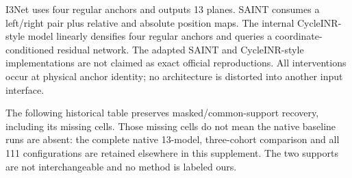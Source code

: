 I3Net uses four regular anchors and outputs 13 planes. SAINT consumes a left/right pair plus relative and absolute position maps. The internal CycleINR-style model linearly densifies four regular anchors and queries a coordinate-conditioned residual network. The adapted SAINT and CycleINR-style implementations are not claimed as exact official reproductions. All interventions occur at physical anchor identity; no architecture is distorted into another input interface.

The following historical table preserves masked/common-support recovery, including its missing cells. Those missing cells do not mean the native baseline runs are absent: the complete native 13-model, three-cohort comparison and all 111 configurations are retained elsewhere in this supplement. The two supports are not interchangeable and no method is labeled ours.



